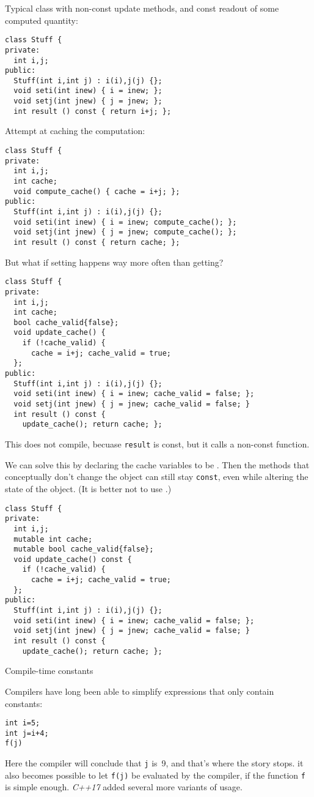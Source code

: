 Typical class with non-const update methods,
and const readout of some computed quantity:
\begin{lstlisting}
class Stuff {
private:
  int i,j;
public:
  Stuff(int i,int j) : i(i),j(j) {};
  void seti(int inew) { i = inew; };
  void setj(int jnew) { j = jnew; };
  int result () const { return i+j; };
\end{lstlisting}
Attempt at caching the computation:
\begin{lstlisting}
class Stuff {
private:
  int i,j;
  int cache;
  void compute_cache() { cache = i+j; };
public:
  Stuff(int i,int j) : i(i),j(j) {};
  void seti(int inew) { i = inew; compute_cache(); };
  void setj(int jnew) { j = jnew; compute_cache(); };
  int result () const { return cache; };
\end{lstlisting}
But what if setting happens way more often than getting?
\begin{lstlisting}
class Stuff {
private:
  int i,j;
  int cache;
  bool cache_valid{false};
  void update_cache() {
    if (!cache_valid) {
      cache = i+j; cache_valid = true;
  };
public:
  Stuff(int i,int j) : i(i),j(j) {};
  void seti(int inew) { i = inew; cache_valid = false; };
  void setj(int jnew) { j = jnew; cache_valid = false; }
  int result () const {
    update_cache(); return cache; };
\end{lstlisting}
This does not compile, becuase \lstinline{result} is const, but it
calls a non-const function.

We can solve this by
declaring the cache variables to be .
Then the methods that conceptually don't change the object
can still stay \lstinline{const}, even while altering the state of the
object.
%
(It is better not to use .)

\begin{lstlisting}
class Stuff {
private:
  int i,j;
  mutable int cache;
  mutable bool cache_valid{false};
  void update_cache() const {
    if (!cache_valid) {
      cache = i+j; cache_valid = true;
  };
public:
  Stuff(int i,int j) : i(i),j(j) {};
  void seti(int inew) { i = inew; cache_valid = false; };
  void setj(int jnew) { j = jnew; cache_valid = false; }
  int result () const {
    update_cache(); return cache; };
\end{lstlisting}

 {Compile-time constants}

Compilers have long been able to simplify expressions that only
contain constants:
\begin{lstlisting}
int i=5;
int j=i+4;
f(j)
\end{lstlisting}
Here the compiler will conclude that \lstinline{j} is~9, and that's
where the story stops. it also
becomes possible to let \lstinline{f(j)} be evaluated by the compiler,
if the function \lstinline{f} is simple enough.
\emph{C++17} added several more variants of
 usage.

